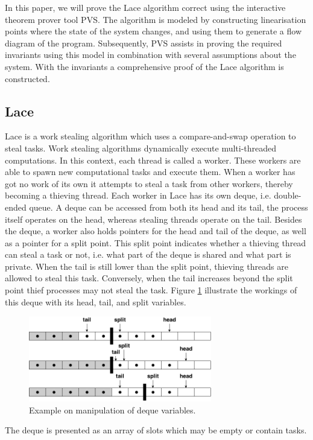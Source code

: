 \documentclass{sig-alternate-br}
\begin{document}
In this paper, we will prove the Lace algorithm correct using the interactive theorem prover tool PVS.
The algorithm is modeled by constructing linearisation points where the state of the system changes, and using them to generate a flow diagram of the program.
Subsequently, PVS assists in proving the required invariants using this model in combination with several assumptions about the system.
With the invariants a comprehensive proof of the Lace algorithm is constructed.

\subsection{Lace}
Lace is a work stealing algorithm\cite{Blumofe1994} which uses a compare-and-swap operation to steal tasks\cite{vanDijk2014206}.
Work stealing algorithms dynamically execute multi-threaded computations.
In this context, each thread is called a worker.
These workers are able to spawn new computational tasks and execute them.
When a worker has got no work of its own it attempts to steal a task from other workers, thereby becoming a thieving thread.
Each worker in Lace has its own deque, i.e. double-ended queue.
A deque can be accessed from both its head and its tail, the process itself operates on the head, whereas stealing threads operate on the tail.
Besides the deque, a worker also holds pointers for the head and tail of the deque, as well as a pointer for a split point.
This split point indicates whether a thieving thread can steal a task or not, i.e. what part of the deque is shared and what part is private.
When the tail is still lower than the split point, thieving threads are allowed to steal this task.
Conversely, when the tail increases beyond the split point thief processes may not steal the task.
Figure \ref{fig:deq} illustrate the workings of this deque with its head, tail, and split variables.
\begin{figure}[h]
	\centering
	\includegraphics[width=8cm]{Lace_Explanation}
	\caption{Example on manipulation of deque variables.}
	\label{fig:deq}
\end{figure}
The deque is presented as an array of slots which may be empty or contain tasks.
\end{document}
